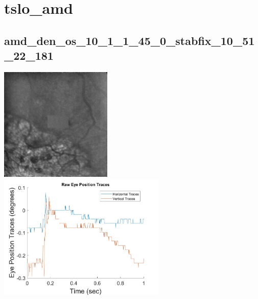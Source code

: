 \documentclass[11pt]{article}
\begin{document}
\section{tslo\_amd}

\subsection{amd\_den\_os\_10\_1\_1\_45\_0\_stabfix\_10\_51\_22\_181}
\includegraphics[width=0.40\textwidth, valign=m]{referenceframes/tslo_amd/amd_den_os_10_1_1_45_0_stabfix_10_51_22_181_dwt_nostim_gamscaled_bandfilt_refframe.jpg}
\includegraphics[width=0.60\textwidth, valign=m]{eyepositiontraces/tslo_amd/amd_den_os_10_1_1_45_0_stabfix_10_51_22_181.jpg}\\
\end{document}

